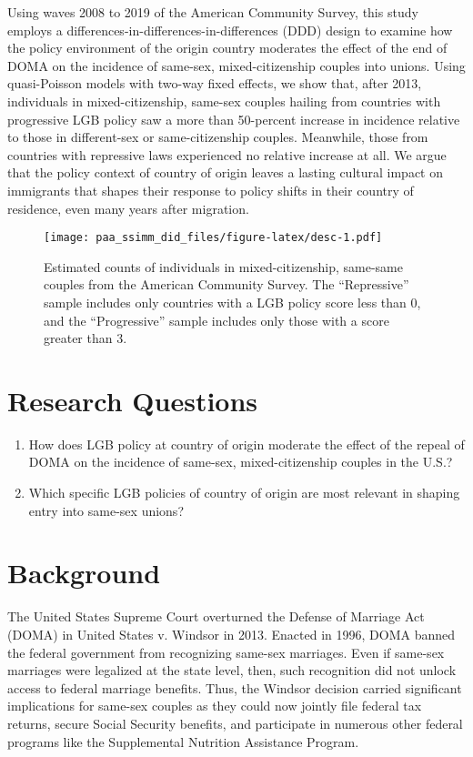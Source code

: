 \documentclass[
  12pt,
]{article}
\begin{document}
Using waves 2008 to 2019 of the American Community Survey, this study employs a differences-in-differences-in-differences (DDD) design to examine how the policy environment of the origin country moderates the effect of the end of DOMA on the incidence of same-sex, mixed-citizenship couples into unions. Using quasi-Poisson models with two-way fixed effects, we show that, after 2013, individuals in mixed-citizenship, same-sex couples hailing from countries with progressive LGB policy saw a more than 50-percent increase in incidence relative to those in different-sex or same-citizenship couples. Meanwhile, those from countries with repressive laws experienced no relative increase at all. We argue that the policy context of country of origin leaves a lasting cultural impact on immigrants that shapes their response to policy shifts in their country of residence, even many years after migration.

\begin{figure}
\centering
\texttt{[image: paa\_ssimm\_did\_files/figure-latex/desc-1.pdf]}
\caption{\label{fig:desc}Estimated counts of individuals in mixed-citizenship, same-same couples from the American Community Survey. The ``Repressive'' sample includes only countries with a LGB policy score less than 0, and the ``Progressive'' sample includes only those with a score greater than 3.}
\end{figure}

\hypertarget{research-questions}{%
\section{Research Questions}\label{research-questions}}

\begin{enumerate}
\def\labelenumi{\arabic{enumi}.}
\item
  How does LGB policy at country of origin moderate the effect of the repeal of DOMA on the incidence of same-sex, mixed-citizenship couples in the U.S.?
\item
  Which specific LGB policies of country of origin are most relevant in shaping entry into same-sex unions?
\end{enumerate}

\hypertarget{background}{%
\section{Background}\label{background}}

The United States Supreme Court overturned the Defense of Marriage Act (DOMA) in United States v. Windsor in 2013. Enacted in 1996, DOMA banned the federal government from recognizing same-sex marriages. Even if same-sex marriages were legalized at the state level, then, such recognition did not unlock access to federal marriage benefits. Thus, the Windsor decision carried significant implications for same-sex couples as they could now jointly file federal tax returns, secure Social Security benefits, and participate in numerous other federal programs like the Supplemental Nutrition Assistance Program.
\end{document}
